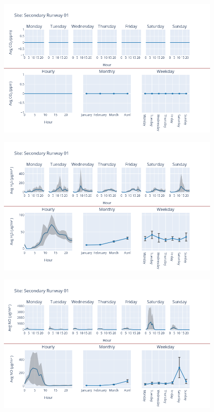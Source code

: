 \documentclass[12pt, oneside]{book}
\begin{document}
{ 
{\begin{figure}[H] 
 \centering 
\includegraphics[width=.88\textwidth, keepaspectratio]{image164} 
 \end{figure}}{} 

{\begin{figure}[H] 
 \centering 
\includegraphics[width=.88\textwidth, keepaspectratio]{image165} 
 \end{figure}}{} 

{\begin{figure}[H] 
 \centering 
\includegraphics[width=.88\textwidth, keepaspectratio]{image166} 
 \end{figure}}{} 

}
\end{document}

